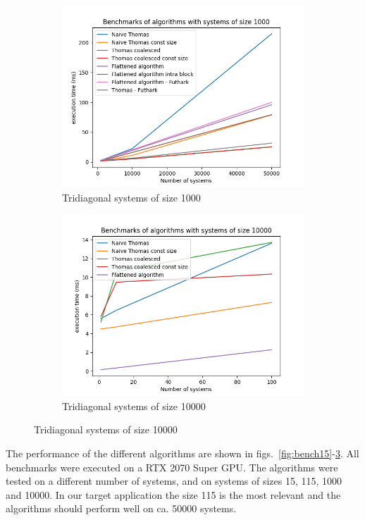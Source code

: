 \documentclass[a4paper,oneside]{memoir}
\begin{document}
\begin{figure}[H]
\begin{subfigure}[b]{0.6\textwidth}
        \centering
    \includegraphics[width=\textwidth]{timings_1000.png}
    \caption{Tridiagonal systems of size 1000}
    \label{fig:bench1000}
    \end{subfigure}
    \begin{subfigure}[b]{0.6\textwidth}
        \centering
    \includegraphics[width=\textwidth]{timings_10000.png}
    \caption{Tridiagonal systems of size 10000}
    \label{fig:bench10000}
    \end{subfigure}
    
 \end{figure}

The performance of the different algorithms are shown in figs.~\ref{fig:bench15}-\ref{fig:bench10000}. All benchmarks were executed on a RTX 2070 Super GPU. 
The algorithms were tested on a different number of systems, and on systems of sizes 15, 115, 1000 and 10000. In our target application the size 115 is the most relevant and the algorithms should perform well on ca. 50000 systems.
\end{document}
